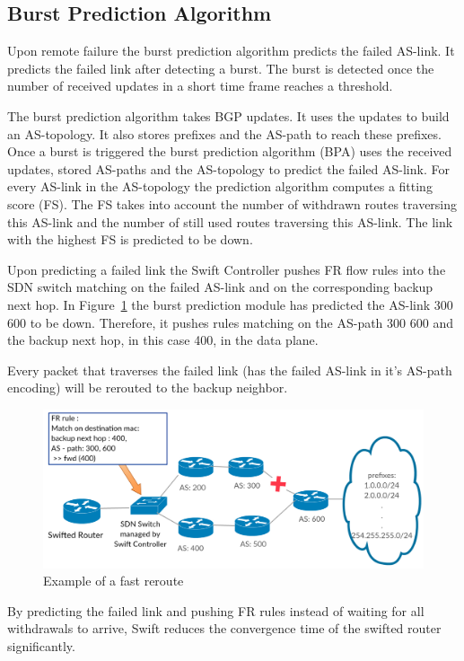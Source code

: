 \subsection{\label{chapter2:Swift:BPA}Burst Prediction Algorithm}
Upon remote failure the burst prediction algorithm predicts the failed AS-link. It predicts the failed link after detecting a burst. The burst is detected once the number of received updates in a short time frame reaches a threshold.

The burst prediction algorithm takes BGP updates. It uses the updates to build an AS-topology. It also stores prefixes and the AS-path to reach these prefixes. Once a burst is triggered the burst prediction algorithm (BPA) uses the received updates, stored AS-paths and the AS-topology to predict the failed AS-link. For every AS-link in the AS-topology the prediction algorithm computes a fitting score (FS). The FS takes into account the number of withdrawn routes traversing this AS-link and the number of still used routes traversing this AS-link. The link with the highest FS is predicted to be down. 

Upon predicting a failed link the Swift Controller pushes FR flow rules into the SDN switch matching on the failed AS-link and on the corresponding backup next hop. In Figure~\ref{fig:swift_FR} the burst prediction module has predicted the AS-link 300 600 to be down. Therefore, it pushes rules matching on the AS-path 300 600 and the backup next hop, in this case 400, in the data plane.

Every packet that traverses the failed link (has the failed AS-link in it's AS-path encoding) will be rerouted to the backup neighbor.

\begin{figure}[h]
\center
\includegraphics[scale = 0.32]{Figures/bckgrnd_swift_fr.pdf}
\caption{Example of a fast reroute}
\label{fig:swift_FR}
\end{figure}

By predicting the failed link and pushing FR rules instead of waiting for all withdrawals to arrive, Swift reduces the convergence time of the swifted router significantly.

